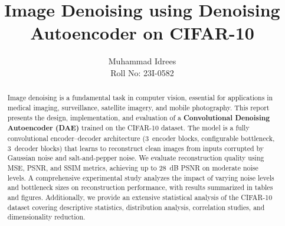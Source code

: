 \documentclass[runningheads]{llncs}
\begin{document}
\title{Image Denoising using Denoising Autoencoder on CIFAR-10}

\author{Muhammad Idrees \\ Roll No: 23I-0582}



\maketitle

\begin{abstract}
Image denoising is a fundamental task in computer vision, essential for applications in medical imaging, surveillance, satellite imagery, and mobile photography. This report presents the design, implementation, and evaluation of a \textbf{Convolutional Denoising Autoencoder (DAE)} trained on the CIFAR-10 dataset. The model is a fully convolutional encoder--decoder architecture (3~encoder blocks, configurable bottleneck, 3~decoder blocks) that learns to reconstruct clean images from inputs corrupted by Gaussian noise and salt-and-pepper noise. We evaluate reconstruction quality using MSE, PSNR, and SSIM metrics, achieving up to 28~dB PSNR on moderate noise levels. A comprehensive experimental study analyzes the impact of varying noise levels and bottleneck sizes on reconstruction performance, with results summarized in tables and figures. Additionally, we provide an extensive statistical analysis of the CIFAR-10 dataset covering descriptive statistics, distribution analysis, correlation studies, and dimensionality reduction.

\end{abstract}


\end{document}

